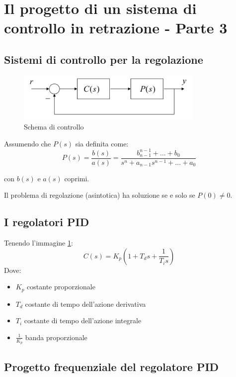 \section{Il progetto di un sistema di controllo in retrazione - Parte 3}

\subsection{Sistemi di controllo per la regolazione}

\begin{figure}[h!]
  \centering
  \includegraphics[width=0.8\textwidth]{./images/lez16_controllo.png}
  \caption{Schema di controllo}
  \label{fig:lez16_controllo}
\end{figure}


Assumendo che $P(s)$ sia definita come:
\begin{equation}
  P(s) = \frac{b(s)}{a(s)} = \frac{b_{n-1}^{n-1} + \dots + b_0}{s^n + a_{n-1}s^{n-1} + \dots + a_0}
\end{equation}

con $b(s)$ e $a(s)$ coprimi.

Il problema di regolazione (asintotica) ha soluzione se e solo se $P(0) \neq
0$.


\subsection{I regolatori PID}

Tenendo l'immagine \ref{fig:lez16_controllo}:
\begin{equation}
  C(s) = K_p(1 + T_d s + \frac{1}{T_i s})
\end{equation}
Dove:
\begin{itemize}
  \item $K_p$ costante proporzionale
  \item $T_d$ costante di tempo dell'azione derivativa
  \item $T_i$ costante di tempo dell'azione integrale
  \item $\frac{1}{K_p}$ banda proporzionale
\end{itemize}


\subsection{Progetto frequenziale del regolatore PID}


